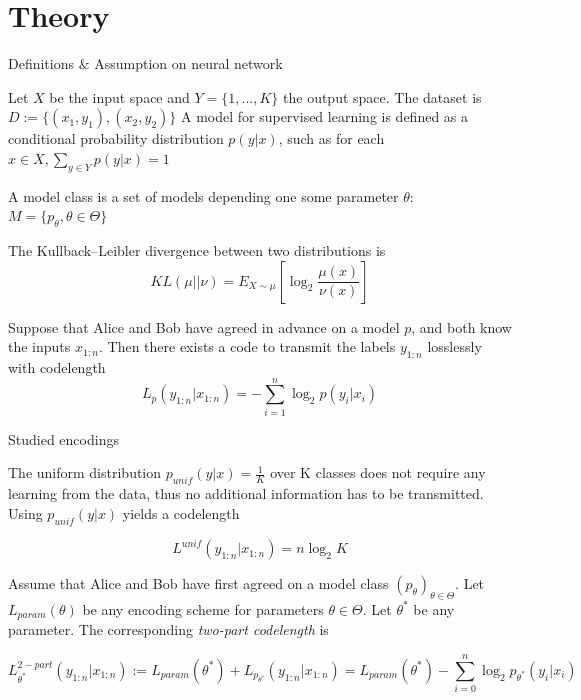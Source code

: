 \documentclass[10pt, handout, envcountsect]{beamer} %
\begin{document}
\section{Theory}
\begin{frame}{Definitions $\&$ Assumption on neural network}

\begin{definition}[Notation]
Let $X$ be the input space and $Y = \{1,...,K\}$ the output space. The dataset is 
$D := \{(x_1, y_1), (x_2, y_2)\}$
A model for supervised learning is defined as a conditional probability distribution
$p(y|x)$, such as for each $x \in X, \sum_{y \in Y}{p(y|x) = 1}$

A model class is a set of models depending one some parameter $\theta$:
$
M = \{p_\theta , \theta \in \Theta\}
$

The Kullback–Leibler divergence between two distributions is 
$$
KL(\mu||\nu) = E_{X \sim \mu}[\log_{2} \frac{\mu(x)}{\nu(x)}]
$$

\end{definition}

\begin{definition}
Suppose that Alice and Bob have agreed in advance on a
model $p$, and both know the inputs $x_{1:n}$. Then there exists a code to transmit the labels $y_{1:n}$ losslessly with codelength
$$
L_p(y_{1:n}|x_{1:n}) = - \sum_{i=1}^{n}\log_{2}p(y_i|x_i)
$$

\end{definition}
    
\end{frame}


\begin{frame}{Studied encodings}

\begin{definition}
The uniform distribution $p_{unif}(y|x) = \frac{1}{K}$ over K classes does not require any learning from the data, thus no additional information has to be transmitted. Using $p_{unif}(y|x)$ yields a codelength

$$
L^{unif}(y_{1:n}|x_{1:n}) = n\log_{2}K
$$
    
\end{definition}

\begin{definition}
Assume that Alice and Bob have first agreed on a model class
$(p_{\theta})_{\theta \in \Theta}$. Let $L_{param}(\theta)$ be any encoding scheme for parameters $\theta \in \Theta$. Let $\theta^{*}$ be any parameter. The corresponding \emph{two-part codelength} is

$$
L_{\theta^{*}}^{2-part}(y_{1:n}|x_{1:n}) := L_{param}(\theta^{*}) + L_{p_{\theta^{*}}}(y_{1:n}|x_{1:n}) = L_{param}(\theta^{*}) - \sum_{i=0}^{n}\log_{2}p_{\theta^{*}}(y_{i}|x_{i})
$$

    
\end{definition}
    
\end{frame}
\end{document}

